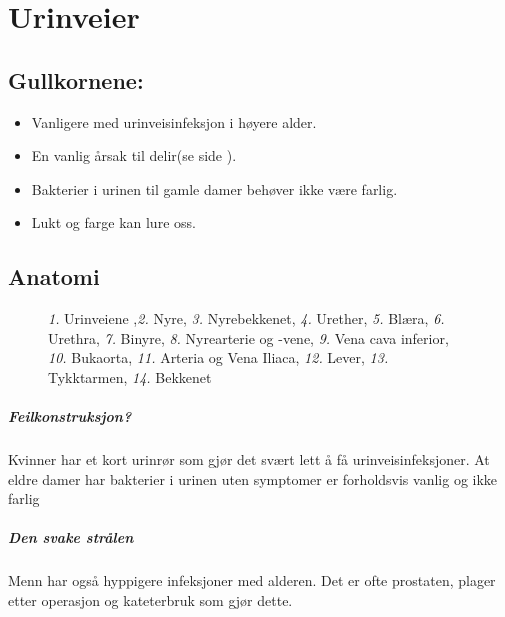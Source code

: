 \chapter{Urinveier}%
		\section{Gullkornene:}
			\begin{itemize}
				\item Vanligere med urinveisinfeksjon i høyere alder.\\
				\item En vanlig årsak til delir(se side \pageref{delir}).\\
				\item Bakterier i urinen til gamle damer behøver ikke være farlig.\\
				\item Lukt og farge kan lure oss.\\
			\end{itemize}
		\section{Anatomi}
					\begin{figure}[ht]
                      \centering
                      \caption{\emph{1.} Urinveiene ,\emph{2.} Nyre, \emph{3.} Nyrebekkenet, \emph{4.} Urether, \emph{5.} Blæra, \emph{6.} Urethra, \emph{7.} Binyre, \emph{8.} Nyrearterie og -vene, \emph{9.} Vena cava inferior, \emph{10.} Bukaorta, \emph{11.} Arteria og Vena Iliaca, \emph{12.} Lever, \emph{13.} Tykktarmen, \emph{14.} Bekkenet}
                    \end{figure}
			\paragraph{Feilkonstruksjon?\\}
				Kvinner har et kort urinrør som gjør det svært lett å få urinveisinfeksjoner. At eldre damer har bakterier i urinen uten symptomer er forholdsvis vanlig og ikke farlig\cite{uti-old}
			\paragraph{Den svake strålen\\}
				Menn har også hyppigere infeksjoner med alderen. Det er ofte prostaten, plager etter operasjon og kateterbruk som gjør dette. 
